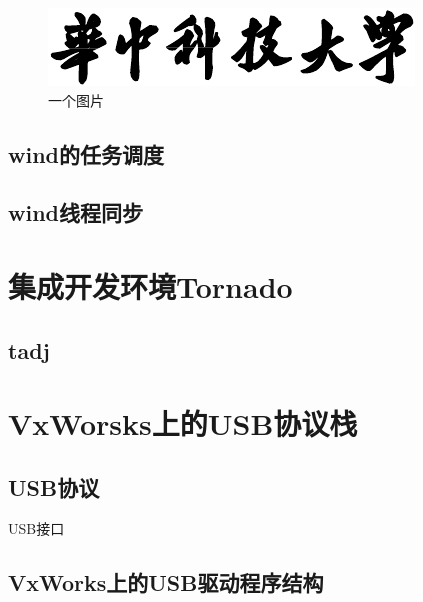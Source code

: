\begin{figure}[!h]
\centering
\includegraphics[width=.4\textwidth]{hust-title.pdf}
\caption{一个图片}\label{fig:1}
\end{figure}

\subsection{wind的任务调度}

\subsection{wind线程同步}

\section{集成开发环境Tornado}
\subsection{tadj}

\section{VxWorsks上的USB协议栈}
\subsection{USB协议}
USB接口
\subsection{VxWorks上的USB驱动程序结构}

